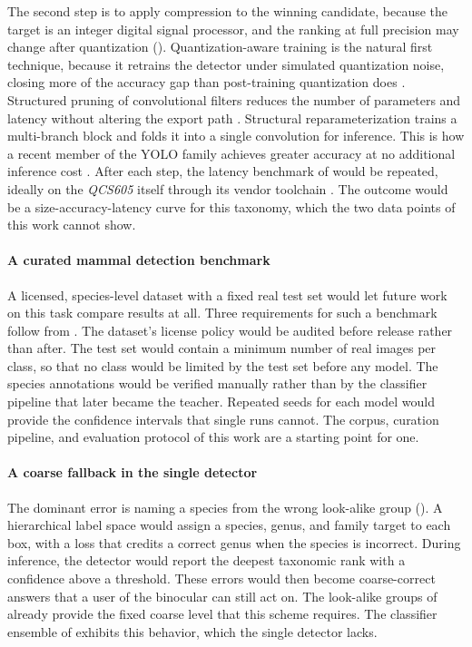 The second step is to apply compression to the winning candidate, because the target is an integer digital signal processor, and the ranking at full precision may change after quantization (). Quantization-aware training is the natural first technique, because it retrains the detector under simulated quantization noise, closing more of the accuracy gap than post-training quantization does \cite{jacobQuantizationTrainingNeural2018}. Structured pruning of convolutional filters reduces the number of parameters and latency without altering the export path \cite{liPruningFiltersEfficient2017}. Structural reparameterization trains a multi-branch block and folds it into a single convolution for inference. This is how a recent member of the YOLO family achieves greater accuracy at no additional inference cost \cite{liYOLOv6SingleStageObject2022}. After each step, the latency benchmark of  would be repeated, ideally on the \textit{QCS605} itself through its vendor toolchain \cite{QualcommAimet2026}. The outcome would be a size-accuracy-latency curve for this taxonomy, which the two data points of this work cannot show.

\paragraph{A curated mammal detection benchmark}
A licensed, species-level dataset with a fixed real test set would let future work on this task compare results at all. Three requirements for such a benchmark follow from . The dataset's license policy would be audited before release rather than after. The test set would contain a minimum number of real images per class, so that no class would be limited by the test set before any model. The species annotations would be verified manually rather than by the classifier pipeline that later became the teacher. Repeated seeds for each model would provide the confidence intervals that single runs cannot. The corpus, curation pipeline, and evaluation protocol of this work are a starting point for one.

\paragraph{A coarse fallback in the single detector}
The dominant error is naming a species from the wrong look-alike group (). A hierarchical label space would assign a species, genus, and family target to each box, with a loss that credits a correct genus when the species is incorrect. During inference, the detector would report the deepest taxonomic rank with a confidence above a threshold. These errors would then become coarse-correct answers that a user of the binocular can still act on. The look-alike groups of  already provide the fixed coarse level that this scheme requires. The classifier ensemble of  exhibits this behavior, which the single detector lacks.

